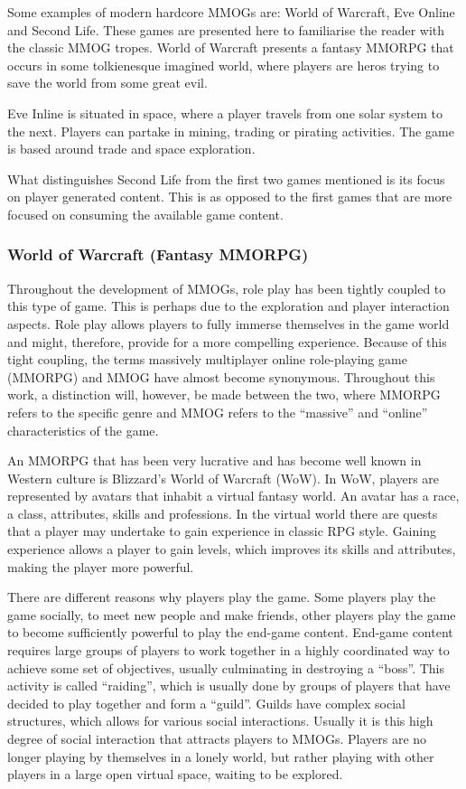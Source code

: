 Some examples of modern hardcore MMOGs are: World of Warcraft, Eve Online and Second Life. These games are presented here to familiarise the reader with the classic MMOG tropes. World of Warcraft presents a fantasy MMORPG that occurs in some tolkienesque imagined world, where players are heros trying to save the world from some great evil.

Eve Inline is situated in space, where a player travels from one solar system to the next. Players can partake in mining, trading or pirating activities. The game is based around trade and space exploration.

What distinguishes Second Life from the first two games mentioned is its focus on player generated content. This is as opposed to the first games that are more focused on consuming the available game content.

\subsubsection{World of Warcraft (Fantasy MMORPG)}

Throughout the development of MMOGs, role play has been tightly coupled to this type of game. This is perhaps due to the exploration and player interaction aspects. Role play allows players to fully immerse themselves in the game world and might, therefore, provide for a more compelling experience. Because of this tight coupling, the terms massively multiplayer online role-playing game (MMORPG) and MMOG have almost become synonymous. Throughout this work, a distinction will, however, be made between the two, where MMORPG refers to the specific genre and MMOG refers to the ``massive'' and ``online'' characteristics of the game.

An MMORPG that has been very lucrative and has become well known in Western culture is Blizzard's World of Warcraft (WoW). In WoW, players are represented by avatars that inhabit a virtual fantasy world. An avatar has a race, a class, attributes, skills and professions. In the virtual world there are quests that a player may undertake to gain experience in classic RPG style. Gaining experience allows a player to gain levels, which improves its skills and attributes, making the player more powerful.

There are different reasons why players play the game. Some players play the game socially, to meet new people and make friends, other players play the game to become sufficiently powerful to play the end-game content. End-game content requires large groups of players to work together in a highly coordinated way to achieve some set of objectives, usually culminating in destroying a ``boss''. This activity is called ``raiding'', which is usually done by groups of players that have decided to play together and form a ``guild''. Guilds have complex social structures, which allows for various social interactions. Usually it is this high degree of social interaction that attracts players to MMOGs. Players are no longer playing by themselves in a lonely world, but rather playing with other players in a large open virtual space, waiting to be explored.

